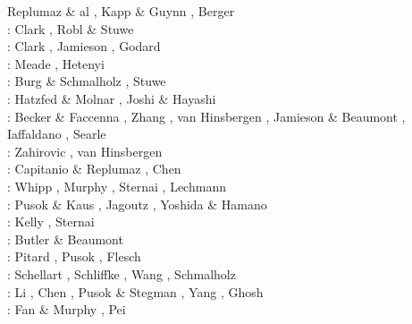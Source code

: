 \begin{itemize}
\begin{scriptsize}
                  Replumaz \& al \cite{rekv04}, Kapp \& Guynn \cite{kagu04}, Berger \etal \cite{bejh04}\\
\twothousandfive: Clark \etal \cite{clbr05}, Robl \& Stuwe \cite{rost05a,rost05b}\\
\twothousandsix: Clark \etal \cite{clrw06}, Jamieson \etal \cite{jabn06}, Godard \etal \cite{golc06}\\
\twothousandseven: Meade \cite{mead07}, Hetenyi \etal \cite{hecb07}\\
\twothousandeight: Burg \& Schmalholz \cite{busc08}, Stuwe \etal \cite{strh08}\\
\twothousandten: Hatzfed \& Molnar \cite{hamo10}, Joshi \& Hayashi \cite{joha10}\\
\twothousandeleven: Becker \& Faccenna \cite{befa11}, Zhang \etal \cite{zhxy11}, 
                    van Hinsbergen \etal \cite{vasd11}, Jamieson \& Beaumont \cite{jabe11},
                    Iaffaldano \etal \cite{iahb11}, Searle \etal \cite{seep11}\\
\twothousandtwelve: Zahirovic \etal \cite{zams12}, van Hinsbergen \etal \cite{vald12}\\
\twothousandthirteen: Capitanio \& Replumaz \cite{care13}, Chen \etal \cite{chgz13,chgz13b}\\
\twothousandfourteen: Whipp \etal \cite{whbb14}, Murphy \etal \cite{mutg14},
                      Sternai \etal \cite{stjm14}, Lechmann \etal \cite{lesh14}\\
\twothousandfifteen: Pusok \& Kaus \cite{puka15}, Jagoutz \etal \cite{jarh15}, 
                     Yoshida \& Hamano\cite{yoha15}\\
\twothousandsixteen: Kelly \etal \cite{kebb16}, Sternai \etal \cite{staj16}\\
\twothousandseventeen: Butler \& Beaumont \cite{bube17}\\
\twothousandeighteen: Pitard \etal \cite{pirf18}, Pusok \etal \cite{pukp18}, Flesch \etal \cite{flbb18}\\
\twothousandnineteen: Schellart \etal \cite{sccs19}, Schliffke \etal \cite{scvm19},
                      Wang \etal \cite{wazg19}, Schmalholz \etal \cite{scdh19}\\
\twothousandtwenty: Li \etal \cite{livn20}, Chen \etal \cite{chlc20}, 
                    Pusok \& Stegman \cite{pust20}, Yang \etal \cite{yakl20}, 
                    Ghosh \etal \cite{ghbm20}\\
\twothousandtwentyone: Fan \& Murphy \cite{famu21}, Pei \etal \cite{pels21}
\end{scriptsize}


\end{itemize}
